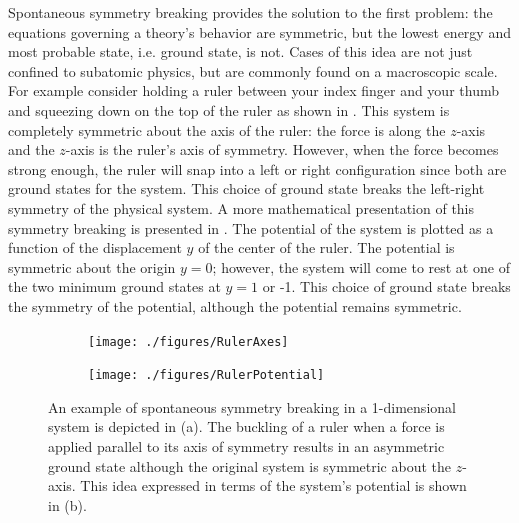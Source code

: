 Spontaneous symmetry breaking provides the solution to the first problem:
the equations governing a theory's behavior are symmetric, but the lowest
energy and most probable state, i.e. ground state, is not. Cases of this idea
are not just confined to subatomic physics, but are commonly found on a
macroscopic scale. For example consider holding a ruler between your index
finger and your thumb and squeezing down on the top of the ruler 
as shown in . This system
is completely symmetric about the axis of the ruler: the force is along the $z$-axis
and the $z$-axis is the ruler's axis of symmetry. However, when the force
becomes strong enough, the ruler will snap into a left or right configuration since
both are ground states for the system. This choice of ground state breaks the
left-right symmetry of the physical system. A more mathematical presentation
of this symmetry breaking is presented in . The potential
of the system is plotted as a function of the displacement $y$ of the center of 
the ruler. The potential is symmetric about the origin $y = 0$; however,
the system will come to rest at one of the two minimum ground states at $y = 1$ or -1.
This choice of ground state breaks the symmetry of the potential, although
the potential remains symmetric.

\begin{figure}[htbp]
   \centering 

    \begin{subfigure}[b]{0.45\textwidth}
        \centering
        \texttt{[image: ./figures/RulerAxes]}
        \caption{}
        \label{fig:ruler}
    \end{subfigure}
    \quad 
    \begin{subfigure}[b]{0.45\textwidth}
        \centering
        \texttt{[image: ./figures/RulerPotential]}
        \caption{}
        \label{fig:rulerpotential}
    \end{subfigure}

    \caption{An example of spontaneous symmetry breaking in a 1-dimensional system
    is depicted in (a).
    The buckling of a ruler when a force is applied parallel to its axis of
    symmetry results in an asymmetric ground state although the original system
    is symmetric about the $z$-axis. This idea expressed in terms of the system's 
    potential is shown in (b).}
    \label{fig:spontaneous}
\end{figure}

